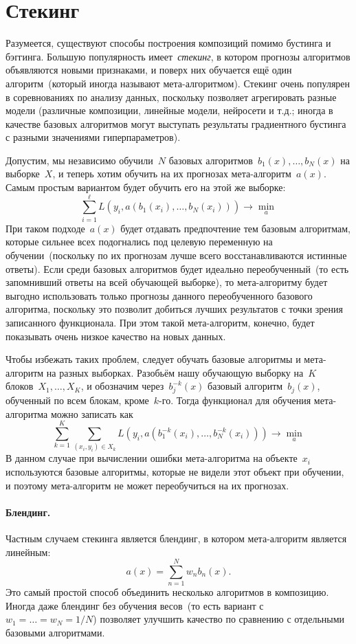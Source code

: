 \documentclass[12pt,fleqn]{article}
\begin{document}
\section{Стекинг}

Разумеется, существуют способы построения композиций помимо бустинга и бэггинга.
Большую популярность имеет~\emph{стекинг}, в котором прогнозы алгоритмов объявляются
новыми признаками, и поверх них обучается ещё один алгоритм~(который иногда называют мета-алгоритмом).
Стекинг очень популярен в соревнованиях по анализу данных, поскольку позволяет агрегировать
разные модели (различные композиции, линейные модели, нейросети и т.д.; иногда в качестве
базовых алгоритмов могут выступать результаты градиентного бустинга с разными
значениями гиперпараметров).

Допустим, мы независимо обучили~$N$ базовых алгоритмов~$b_1(x), \dots, b_N(x)$ на выборке~$X$,
и теперь хотим обучить на их прогнозах мета-алгоритм~$a(x)$.
Самым простым вариантом будет обучить его на этой же выборке:
\[
    \sum_{i = 1}^{\ell}
        L(y_i, a(b_1(x_i), \dots, b_N(x_i)))
    \to
    \min_{a}
\]
При таком подходе~$a(x)$ будет отдавать предпочтение тем базовым алгоритмам,
которые сильнее всех подогнались под целевую переменную на обучении~(поскольку по их прогнозам
лучше всего восстанавливаются истинные ответы).
Если среди базовых алгоритмов будет идеально переобученный~(то есть запомнивший
ответы на всей обучающей выборке), то мета-алгоритму будет выгодно
использовать только прогнозы данного переобученного базового алгоритма,
поскольку это позволит добиться лучших результатов с точки зрения записанного функционала.
При этом такой мета-алгоритм, конечно, будет показывать очень низкое качество на новых данных.

Чтобы избежать таких проблем, следует обучать базовые алгоритмы и мета-алгоритм
на разных выборках.
Разобьём нашу обучающую выборку на~$K$ блоков~$X_1, \dots, X_K$,
и обозначим через~$b_j^{-k}(x)$ базовый алгоритм~$b_j(x)$, обученный по всем блокам,
кроме~$k$-го.
Тогда функционал для обучения мета-алгоритма можно записать как
\[
    \sum_{k = 1}^{K}
    \sum_{(x_i, y_i) \in X_k}
        L\left(
            y_i,
            a(b_1^{-k}(x_i), \dots, b_N^{-k}(x_i))
        \right)
    \to
    \min_{a}
\]
В данном случае при вычислении ошибки мета-алгоритма на объекте~$x_i$
используются базовые алгоритмы, которые не видели этот объект при обучении,
и поэтому мета-алгоритм не может переобучиться на их прогнозах.

\paragraph{Блендинг.}
Частным случаем стекинга является блендинг, в котором мета-алгоритм является линейным:
\[
    a(x)
    =
    \sum_{n = 1}^{N}
        w_n b_n(x).
\]
Это самый простой способ объединить несколько алгоритмов в композицию.
Иногда даже блендинг без обучения весов~(то есть вариант с~$w_1 = \dots = w_N = 1/N$)
позволяет улучшить качество по сравнению с отдельными базовыми алгоритмами.
\end{document}
